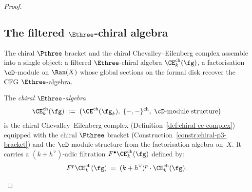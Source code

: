 \begin{proof}
\subsection{The filtered $\Ethree$-chiral algebra}
\label{subsec:filtered-e3-chiral}

The chiral $\Pthree$ bracket and the chiral
Chevalley--Eilenberg complex assemble into a single object:
a filtered $\Ethree$-chiral algebra
$\CE^{\mathrm{ch}}_k(\fg)$, a factorisation $\cD$-module
on $\Ran(X)$ whose global sections on the formal disk
recover the CFG $\Ethree$-algebra.

\begin{definition}
\label{def:filtered-e3-chiral}
The \emph{chiral $\Ethree$-algebra}
\begin{equation}\label{eq:chiral-e3-algebra}
  \CE^{\mathrm{ch}}_k(\fg)
  \;:=\;
  \bigl(\CE^{\mathrm{ch}}(\fg_k),\;
  \{-,-\}^{\mathrm{ch}},\;
  \cD\textrm{-module structure}\bigr)
\end{equation}
is the chiral Chevalley--Eilenberg complex
(Definition~\ref{def:chiral-ce-complex}) equipped with
the chiral $\Pthree$ bracket
(Construction~\ref{constr:chiral-p3-bracket}) and the
$\cD$-module structure from the factorisation algebra
on~$X$. It carries a $(k+h^\vee)$-adic filtration
$F^\bullet \CE^{\mathrm{ch}}_k(\fg)$ defined by:
\begin{equation}\label{eq:hbar-filtration}
  F^p \CE^{\mathrm{ch}}_k(\fg)
  \;=\;
  (k+h^\vee)^p \cdot \CE^{\mathrm{ch}}_k(\fg).
\end{equation}
\end{definition}


\end{proof}
